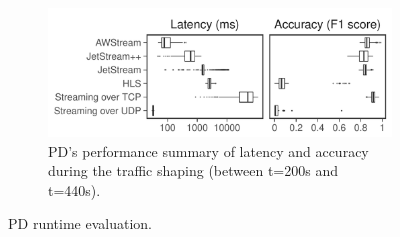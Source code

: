 \documentclass[twocolumn, 9pt]{article}
\begin{document}
\begin{figure}[t]
\begin{subfigure}[t]{\columnwidth}
    \centering
    \includegraphics[width=\columnwidth]{figures/runtime_mot-boxplot.pdf}
    \caption{PD's performance summary of latency and accuracy during the traffic
      shaping (between t=200s and t=440s).}
    \label{fig:pd-runtime-boxplot}
  \end{subfigure}
  \caption{PD runtime evaluation.}
  \label{fig:pd-runtime}
\end{figure}
\end{document}
